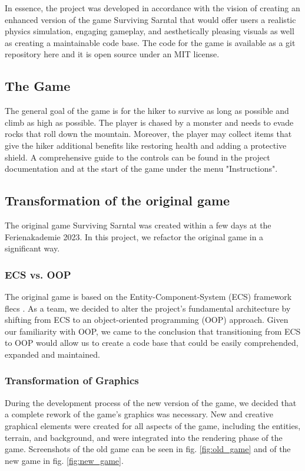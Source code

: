 In essence, the project was developed in accordance with the vision of creating an enhanced version of the game \glqq Surviving Sarntal\grqq{}
that would offer users a realistic physics simulation, engaging gameplay, and aesthetically pleasing visuals as well as creating a maintainable code base.
The code for the game is available as a git repository here \cite{ProjectCode} and it is open source under an MIT license.

\subsection{The Game}
The general goal of the game is for the hiker to survive as long as possible and climb as high as possible. 
The player is chased by a monster and needs to evade rocks that roll down the mountain. 
Moreover, the player may collect items that give the hiker additional benefits like restoring health and adding a protective shield. 
A comprehensive guide to the controls can be found in the project documentation \cite{ProjectWiki} and at the start of the game under the menu "Instructions". 

\subsection{Transformation of the original game}
The original game \glqq Surviving Sarntal\grqq{} was created within a few days at the \glqq Ferienakademie 2023\grqq{}.
In this project, we refactor the original game in a significant way. 

\subsubsection{ECS vs. OOP}
The original game is based on the Entity-Component-System (ECS) framework flecs \cite{flecs_library}.
As a team, we decided to alter the project's fundamental architecture by shifting from ECS
to an object-oriented programming (OOP) approach.
Given our familiarity with OOP, we came to the conclusion that transitioning from ECS to OOP
would allow us to create a code base that could be easily comprehended, expanded and maintained.

\subsubsection{Transformation of Graphics}
During the development process of the new version of the game, we decided that a complete rework of the game's graphics was necessary.
New and creative graphical elements were created for all aspects of the game, including the entities, terrain, and background, and were integrated into the rendering phase of the game.
Screenshots of the old game can be seen in fig. \ref{fig:old_game} and of the new game in fig. \ref{fig:new_game}.

